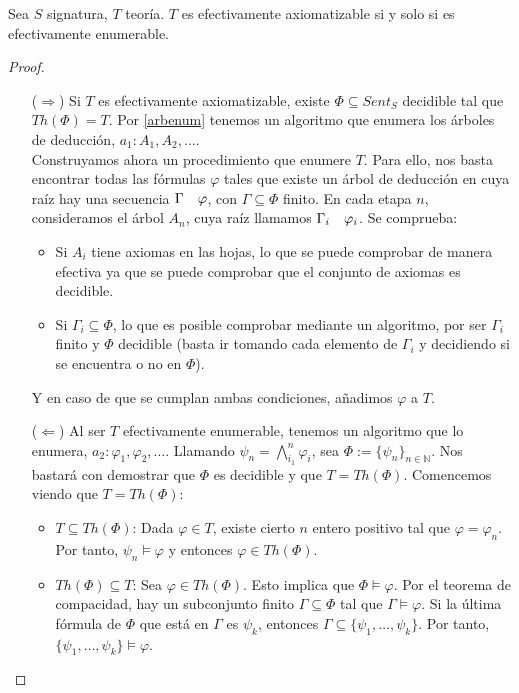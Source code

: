\begin{theorem*}
Sea $S$ signatura, $T$ teoría. $T$ es efectivamente axiomatizable si y solo si es efectivamente enumerable.
\end{theorem*}
\begin{proof}\mbox{}
\begin{itemize}
    \item[($\Longrightarrow$)] Si $T$ es efectivamente axiomatizable, existe $\Phi \subseteq Sent_S$ decidible tal que $Th(\Phi) = T$. Por \ref{arbenum} tenemos  un algoritmo que enumera los árboles de deducción, $a_1: A_1, A_2, \dots$.\\

Construyamos ahora un procedimiento que enumere $T$. Para ello, nos basta encontrar todas las fórmulas $\varphi$ tales que existe un árbol de deducción en cuya raíz hay una secuencia $\Gamma\quad\varphi$, con $\Gamma\subseteq\Phi$ finito. En cada etapa $n$, consideramos el árbol $A_n$, cuya raíz llamamos $\Gamma_i \quad \varphi_i$. Se comprueba:
\begin{itemize}
    \item Si $A_i$ tiene axiomas en las hojas, lo que se puede comprobar de manera efectiva ya que se puede comprobar que el conjunto de axiomas es decidible.
    \item Si $\Gamma_i \subseteq \Phi$, lo que es posible comprobar mediante un algoritmo, por ser $\Gamma_i$ finito y $\Phi$ decidible (basta ir tomando cada elemento de $\Gamma_i$ y decidiendo si se encuentra o no en $\Phi$).
\end{itemize}

Y en caso de que se cumplan ambas condiciones, añadimos $\varphi$ a $T$.

    \item[($\Longleftarrow$)] Al ser $T$ efectivamente enumerable, tenemos un algoritmo que lo enumera, $a_2: \varphi_1, \varphi_2, \dots$. Llamando $\psi_n=\bigwedge_{i_1}^n\varphi_i$, sea $\Phi := \{\psi_n\}_{n\in\mathbb{N}}$. Nos bastará con demostrar que $\Phi$ es decidible y que $T=Th(\Phi)$. Comencemos viendo que $T = Th(\Phi)$:
    \begin{itemize}
        \item $T\subseteq Th(\Phi)$: Dada $\varphi \in T$, existe cierto $n$ entero positivo tal que $\varphi = \varphi_n$. Por tanto, $\psi_n \vDash \varphi$ y entonces $\varphi \in Th(\Phi)$.
        \item $Th(\Phi)\subseteq T$: Sea $\varphi\in Th(\Phi)$. Esto implica que $\Phi\vDash\varphi$. Por el teorema de compacidad, hay un subconjunto finito $\Gamma\subseteq\Phi$ tal  que $\Gamma\vDash\varphi$. Si la última fórmula de $\Phi$ que está en $\Gamma$ es $\psi_k$, entonces $\Gamma\subseteq\{\psi_1,\dots,\psi_k\}$. Por tanto, $\{\psi_1,\dots,\psi_k\}\vDash\varphi$.\\
        

\end{itemize}
\end{itemize}
\end{proof}
